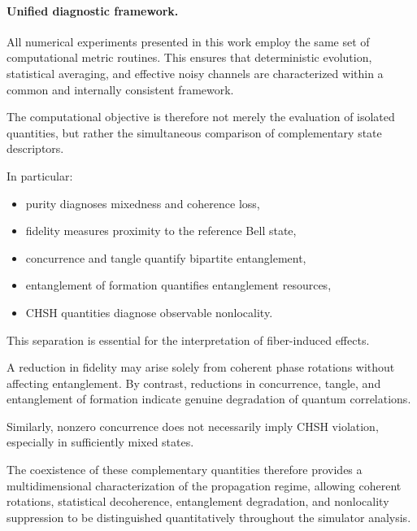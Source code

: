 \paragraph{Unified diagnostic framework.}

All numerical experiments presented in this work employ the same set of computational metric routines. This ensures that deterministic evolution, statistical averaging, and effective noisy channels are characterized within a common and internally consistent framework.

\medskip

The computational objective is therefore not merely the evaluation of isolated quantities, but rather the simultaneous comparison of complementary state descriptors.

In particular:

\begin{itemize}
    \item purity diagnoses mixedness and coherence loss,
    \item fidelity measures proximity to the reference Bell state,
    \item concurrence and tangle quantify bipartite entanglement,
    \item entanglement of formation quantifies entanglement resources,
    \item CHSH quantities diagnose observable nonlocality.
\end{itemize}

\medskip

This separation is essential for the interpretation of fiber-induced effects.

A reduction in fidelity may arise solely from coherent phase rotations without affecting entanglement. By contrast, reductions in concurrence, tangle, and entanglement of formation indicate genuine degradation of quantum correlations.

Similarly, nonzero concurrence does not necessarily imply CHSH violation, especially in sufficiently mixed states.

\medskip

The coexistence of these complementary quantities therefore provides a multidimensional characterization of the propagation regime, allowing coherent rotations, statistical decoherence, entanglement degradation, and nonlocality suppression to be distinguished quantitatively throughout the simulator analysis.
